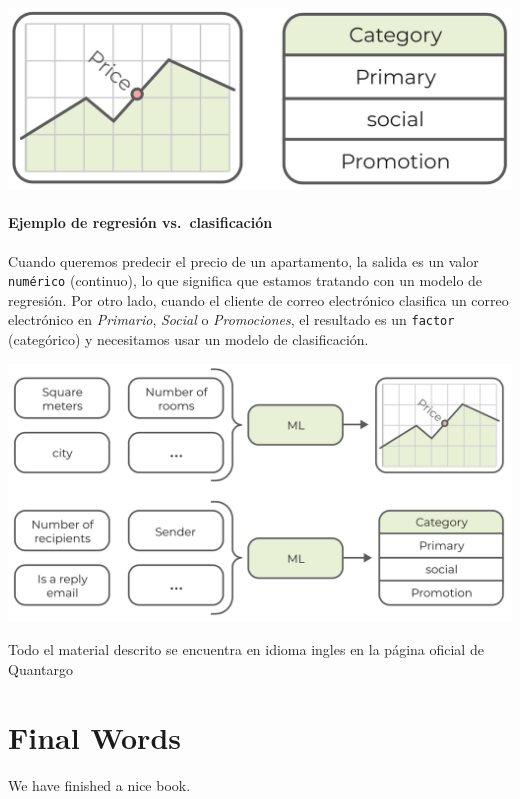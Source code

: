 \documentclass[
]{book}
\begin{document}
\includegraphics{img/reg.png}

\hypertarget{ejemplo-de-regresiuxf3n-vs.-clasificaciuxf3n}{%
\subsubsection{Ejemplo de regresión vs.~clasificación}\label{ejemplo-de-regresiuxf3n-vs.-clasificaciuxf3n}}

Cuando queremos predecir el precio de un apartamento, la salida es un valor \texttt{numérico} (continuo), lo que significa que estamos tratando con un modelo de regresión. Por otro lado, cuando el cliente de correo electrónico clasifica un correo electrónico en \emph{Primario}, \emph{Social} o \emph{Promociones}, el resultado es un \texttt{factor} (categórico) y necesitamos usar un modelo de clasificación.

\includegraphics{img/RCE.png}

Todo el material descrito se encuentra en idioma ingles en la página oficial de Quantargo \citep{quantargo2}

\hypertarget{final-words}{%
\chapter{Final Words}\label{final-words}}

We have finished a nice book.

  
\end{document}
